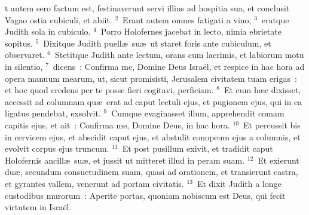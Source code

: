 \bchapter
{}t autem sero factum est, festinaverunt servi illius ad hospitia sua, et conclusit Vagao ostia cubiculi, et abiit.
${}^{2}$~Erant autem omnes fatigati a vino,
${}^{3}$~eratque Judith sola in cubiculo.
${}^{4}$~Porro Holofernes jacebat in lecto, nimia ebrietate sopitus.
${}^{5}$~Dixitque Judith puell\ae\ su\ae\ ut staret foris ante cubiculum, et observaret.
${}^{6}$~Stetitque Judith ante lectum, orans cum lacrimis, et labiorum motu in silentio,
${}^{7}$~dicens~: Confirma me, Domine Deus Isra\"el, et respice in hac hora ad opera manuum mearum, ut, sicut promisisti, Jerusalem civitatem tuam erigas~: et hoc quod credens per te posse fieri cogitavi, perficiam.
${}^{8}$~Et cum h\ae c dixisset, accessit ad columnam qu\ae\ erat ad caput lectuli ejus, et pugionem ejus, qui in ea ligatus pendebat, exsolvit.
${}^{9}$~Cumque evaginasset illum, apprehendit comam capitis ejus, et ait~: Confirma me, Domine Deus, in hac hora.
${}^{10}$~Et percussit bis in cervicem ejus, et abscidit caput ejus, et abstulit conopeum ejus a columnis, et evolvit corpus ejus truncum.
${}^{11}$~Et post pusillum exivit, et tradidit caput Holofernis ancill\ae\ su\ae , et jussit ut mitteret illud in peram suam.
${}^{12}$~Et exierunt du\ae , secundum consuetudinem suam, quasi ad orationem, et transierunt castra, et gyrantes vallem, venerunt ad portam civitatis.
${}^{13}$~Et dixit Judith a longe custodibus murorum~: Aperite portas, quoniam nobiscum est Deus, qui fecit virtutem in Isra\"el.


